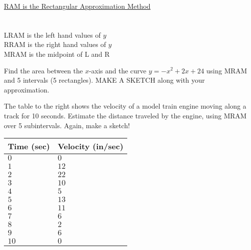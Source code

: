 \documentclass[addpoints, 12pt]{exam}
\newcommand\Tstrut{\rule{0pt}{2.6ex}}         %
\newcommand\Bstrut{\rule[-0.9ex]{0pt}{0pt}}   %
\begin{document}
\begin{questions}
    
    \begin{center}
        \underline{RAM is the Rectangular Approximation Method}\\
        \\
        \\
        LRAM is the left hand values of $y$\\
        RRAM is the right hand values of $y$\\
        MRAM is the midpoint of L and R
    \end{center}
    
    
    \newpage
    
    \question Find the area between the $x$-axis and the curve $y=-x^2+2x+24$ using MRAM and 5 intervals (5 rectangles). MAKE A SKETCH along with your approximation.
    
    
    \begin{minipage}[t]{0.55\linewidth}
    \question The table to the right shows the velocity of a model train engine moving along a track for 10 seconds. Estimate the distance traveled by the engine, using MRAM over 5 subintervals. Again, make a sketch!    
    \end{minipage}
    \hfill
    \begin{minipage}[t]{0.4\linewidth}
    \begin{longtable}[ht]{|C{2.25cm}|C{3cm}|}
        \hline
        Time (sec)\Tstrut\Bstrut & Velocity (in/sec)\Tstrut\Bstrut \\\hline
        $0$\Tstrut\Bstrut & $0$\Tstrut\Bstrut \\\hline
        $1$\Tstrut\Bstrut & $12$\Tstrut\Bstrut \\\hline
        $2$\Tstrut\Bstrut & $22$\Tstrut\Bstrut \\\hline
        $3$\Tstrut\Bstrut & $10$\Tstrut\Bstrut \\\hline
        $4$\Tstrut\Bstrut & $5$\Tstrut\Bstrut \\\hline 
        $5$\Tstrut\Bstrut & $13$\Tstrut\Bstrut \\\hline
        $6$\Tstrut\Bstrut & $11$\Tstrut\Bstrut \\\hline
        $7$\Tstrut\Bstrut & $6$\Tstrut\Bstrut \\\hline
        $8$\Tstrut\Bstrut & $2$\Tstrut\Bstrut \\\hline
        $9$\Tstrut\Bstrut & $6$\Tstrut\Bstrut \\\hline
        $10$\Tstrut\Bstrut & $0$\Tstrut\Bstrut \\\hline
    \end{longtable}    
    \end{minipage}
    


\end{questions}
\end{document}
